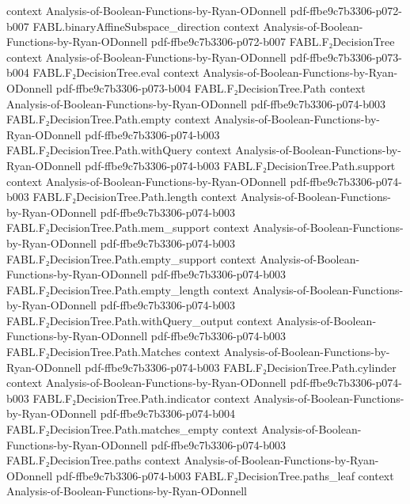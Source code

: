 \begin{theorem}
  {context}
  {Analysis-of-Boolean-Functions-by-Ryan-ODonnell}
  {pdf-ffbe9c7b3306-p072-b007}
\proofstep
  {FABL.binaryAffineSubspace_direction}
  {context}
  {Analysis-of-Boolean-Functions-by-Ryan-ODonnell}
  {pdf-ffbe9c7b3306-p072-b007}
\proofstep
  {FABL.F₂DecisionTree}
  {context}
  {Analysis-of-Boolean-Functions-by-Ryan-ODonnell}
  {pdf-ffbe9c7b3306-p073-b004}
\proofstep
  {FABL.F₂DecisionTree.eval}
  {context}
  {Analysis-of-Boolean-Functions-by-Ryan-ODonnell}
  {pdf-ffbe9c7b3306-p073-b004}
\proofstep
  {FABL.F₂DecisionTree.Path}
  {context}
  {Analysis-of-Boolean-Functions-by-Ryan-ODonnell}
  {pdf-ffbe9c7b3306-p074-b003}
\proofstep
  {FABL.F₂DecisionTree.Path.empty}
  {context}
  {Analysis-of-Boolean-Functions-by-Ryan-ODonnell}
  {pdf-ffbe9c7b3306-p074-b003}
\proofstep
  {FABL.F₂DecisionTree.Path.withQuery}
  {context}
  {Analysis-of-Boolean-Functions-by-Ryan-ODonnell}
  {pdf-ffbe9c7b3306-p074-b003}
\proofstep
  {FABL.F₂DecisionTree.Path.support}
  {context}
  {Analysis-of-Boolean-Functions-by-Ryan-ODonnell}
  {pdf-ffbe9c7b3306-p074-b003}
\proofstep
  {FABL.F₂DecisionTree.Path.length}
  {context}
  {Analysis-of-Boolean-Functions-by-Ryan-ODonnell}
  {pdf-ffbe9c7b3306-p074-b003}
\proofstep
  {FABL.F₂DecisionTree.Path.mem_support}
  {context}
  {Analysis-of-Boolean-Functions-by-Ryan-ODonnell}
  {pdf-ffbe9c7b3306-p074-b003}
\proofstep
  {FABL.F₂DecisionTree.Path.empty_support}
  {context}
  {Analysis-of-Boolean-Functions-by-Ryan-ODonnell}
  {pdf-ffbe9c7b3306-p074-b003}
\proofstep
  {FABL.F₂DecisionTree.Path.empty_length}
  {context}
  {Analysis-of-Boolean-Functions-by-Ryan-ODonnell}
  {pdf-ffbe9c7b3306-p074-b003}
\proofstep
  {FABL.F₂DecisionTree.Path.withQuery_output}
  {context}
  {Analysis-of-Boolean-Functions-by-Ryan-ODonnell}
  {pdf-ffbe9c7b3306-p074-b003}
\proofstep
  {FABL.F₂DecisionTree.Path.Matches}
  {context}
  {Analysis-of-Boolean-Functions-by-Ryan-ODonnell}
  {pdf-ffbe9c7b3306-p074-b003}
\proofstep
  {FABL.F₂DecisionTree.Path.cylinder}
  {context}
  {Analysis-of-Boolean-Functions-by-Ryan-ODonnell}
  {pdf-ffbe9c7b3306-p074-b003}
\proofstep
  {FABL.F₂DecisionTree.Path.indicator}
  {context}
  {Analysis-of-Boolean-Functions-by-Ryan-ODonnell}
  {pdf-ffbe9c7b3306-p074-b004}
\proofstep
  {FABL.F₂DecisionTree.Path.matches_empty}
  {context}
  {Analysis-of-Boolean-Functions-by-Ryan-ODonnell}
  {pdf-ffbe9c7b3306-p074-b003}
\proofstep
  {FABL.F₂DecisionTree.paths}
  {context}
  {Analysis-of-Boolean-Functions-by-Ryan-ODonnell}
  {pdf-ffbe9c7b3306-p074-b003}
\proofstep
  {FABL.F₂DecisionTree.paths_leaf}
  {context}
  {Analysis-of-Boolean-Functions-by-Ryan-ODonnell}

\end{theorem}
